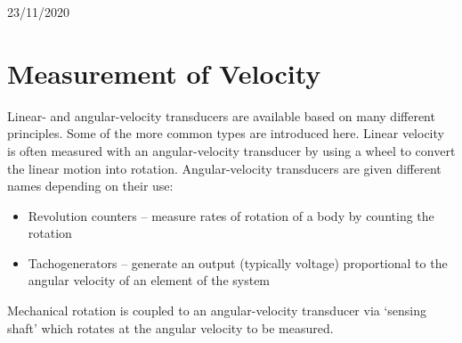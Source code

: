 \documentclass[class=report, crop=false, 12pt,a4paper]{standalone}
\begin{document}
\begin{center}
  23/11/2020
\end{center}
\section{Measurement of Velocity}
Linear- and angular-velocity transducers are available based on many different principles. Some of the more common types are introduced here. Linear velocity is often measured with an angular-velocity transducer by using a wheel to convert the linear motion into rotation. Angular-velocity transducers are given different names depending on their use:
\begin{itemize}
  \item Revolution counters – measure rates of rotation of a body by counting the rotation
  \item Tachogenerators – generate an output (typically voltage) proportional to the angular velocity of an element of the system
\end{itemize}
Mechanical rotation is coupled to an angular-velocity transducer via ‘sensing shaft’ which rotates at the angular velocity to be measured.
\end{document}
